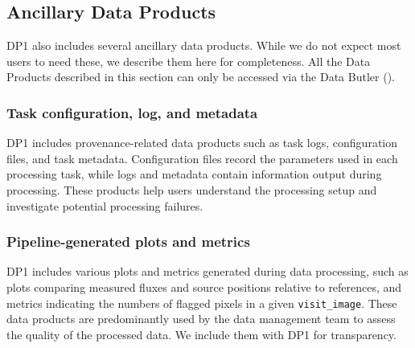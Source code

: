 



\subsection{Ancillary Data Products
\label{subsec:ancilliary}}
DP1 also includes several ancillary data products. While we do not expect most users to need these, we describe them here for completeness. All the Data Products described in this section can only be accessed via the Data Butler ().

\subsubsection{Task configuration, log, and metadata}
\gls{DP1} includes \gls{provenance}-related data products such as task logs, \gls{configuration} files, and task metadata.
Configuration files record the parameters used in each processing task, while logs and \gls{metadata} contain information output during processing. These products help users understand the processing setup and investigate potential processing failures.

\subsubsection{Pipeline-generated plots and metrics}
\gls{DP1} includes various plots and metrics generated during data processing, such as  plots comparing measured fluxes and source positions relative to references, and metrics indicating the numbers of flagged pixels in a given \texttt{visit\_image}. These data products are predominantly used by the data management team to assess the quality of the processed data. We include them with \gls{DP1} for transparency.

